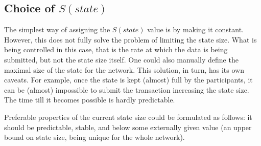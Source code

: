 \documentclass[]{llncs}   %
\newcommand{\authnote}[2]{\marginpar{\parbox{\marginparwidth}{\tiny %
  \textsf{#1 {\textcolor{blue}{notes: #2}}}}}%
  \textcolor{blue}{\textbf{\dag}}}
\newcommand{\authnote}[2]{
  \textsf{#1\textcolor{blue}{ #2}}}
\newcommand{\authnote}[2]{}
\newcommand{\dnote}[1]{{\authnote{\textcolor{red}{Dima notes:}}{#1}}}
\begin{document}
\subsection{Choice of $S(state)$}

The simplest way of assigning the $S(state)$ value is by making it constant.
However, %
this does not fully solve the problem of limiting the state size. What is being controlled in this case,
that is the rate at which the data is being submitted, but not the state size
itself. One could also manually define the maximal size of the state for the
network. This solution, in turn, has its own caveats. For example, once the
state is kept (almost) full by the participants, it can be (almost) impossible
to submit the transaction increasing the state size.  The time till it becomes
possible is hardly predictable. 

Preferable properties of the current state size could be formulated as follows:
it should be predictable, stable, and below some externally given value (an upper
bound on state size, being unique for the whole network). 
\end{document}
